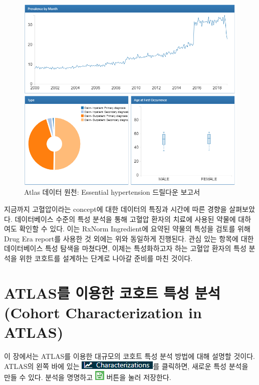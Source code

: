 \documentclass[11pt]{book}
\theoremstyle{definition}
\theoremstyle{definition}
\theoremstyle{definition}
\theoremstyle{remark}
\begin{document}
\begin{figure}

{\centering \includegraphics[width=1\linewidth]{images/Characterization/atlasDataSourcesDrillDownReport} 

}

\caption{Atlas 데이터 원천: Essential hypertension 드릴다운 보고서}\label{fig:atlasDataSourcesDrillDownReport}
\end{figure}

지금까지 고혈압이라는 concept에 대한 데이터의 특징과 시간에 따른 경향을
살펴보았다. 데이터베이스 수준의 특성 분석을 통해 고혈압 환자의 치료에
사용된 약물에 대하여도 확인할 수 있다. 이는 RxNorm Ingredient에 요약된
약물의 특성을 검토를 위해 Drug Era report를 사용한 것 외에는 위와
동일하게 진행된다. 관심 있는 항목에 대한 데이터베이스 특성 탐색을
마쳤다면, 이제는 특성화하고자 하는 고혈압 환자의 특성 분석을 위한
코호트를 설계하는 단계로 나아갈 준비를 마친 것이다.

\section{ATLAS를 이용한 코호트 특성 분석 (Cohort Characterization in
ATLAS)}\label{atlas-----cohort-characterization-in-atlas}

이 장에서는 ATLAS를 이용한 대규모의 코호트 특성 분석 방법에 대해 설명할
것이다. ATLAS의 왼쪽 바에 있는
\includegraphics{images/Characterization/atlasCharacterizationMenuItem.png}를
클릭하면, 새로운 특성 분석을 만들 수 있다. 분석을 명명하고
\includegraphics{images/PopulationLevelEstimation/save.png} 버튼을 눌러
저장한다.
\end{document}
